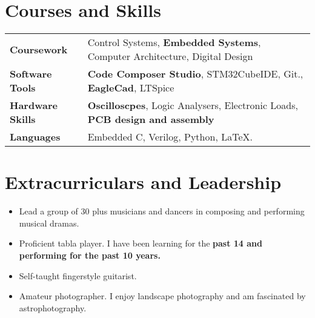 \documentclass{resume}
\begin{document}

\section{Courses and Skills}
\vspace{-0.6cm}
\begin{table}[!htb]
    \begin{tabular}{l|l}
    \textbf{Coursework}        &   Control Systems, \textbf{Embedded Systems}, Computer Architecture, Digital Design\\
    \textbf{Software Tools}&   \textbf{Code Composer Studio}, STM32CubeIDE, Git., \textbf{EagleCad}, LTSpice\\
    \textbf{Hardware Skills}    &   \textbf{Oscilloscpes}, Logic Analysers, Electronic Loads, \textbf{PCB design and assembly}\\
    \textbf{Languages}    &   Embedded C, Verilog, Python, \LaTeX.\\
    \end{tabular}
\end{table}
\section{Extracurriculars and Leadership}
\begin{itemize}\setlength{\itemsep}{3pt}\setlength{\parskip}{0pt}
        \item Lead a group of 30 plus musicians and dancers in composing and performing musical dramas. 
    \end{itemize}
\begin{itemize}\setlength{\itemsep}{3pt}\setlength{\parskip}{0pt}
    \item Proficient tabla player. I have been learning for the \textbf{past 14 and performing for the past 10 years.}
    \item Self-taught fingerstyle guitarist.
\end{itemize}
\begin{itemize}\setlength{\itemsep}{3pt}\setlength{\parskip}{0pt}
        \item Amateur photographer. I enjoy landscape photography and am fascinated by astrophotography.
    \end{itemize}
\end{document}
